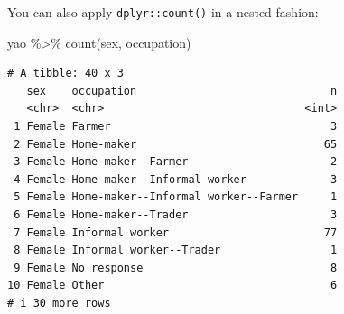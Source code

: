 \documentclass[
  letterpaper,
  DIV=11,
  numbers=noendperiod]{scrreprt}
\newenvironment{Shaded}{\begin{snugshade}}{\end{snugshade}}
\newcommand{\FunctionTok}[1]{\textcolor[rgb]{0.28,0.35,0.67}{#1}}
\newcommand{\NormalTok}[1]{\textcolor[rgb]{0.00,0.23,0.31}{#1}}
\newcommand{\SpecialCharTok}[1]{\textcolor[rgb]{0.37,0.37,0.37}{#1}}
\begin{document}
You can also apply \texttt{dplyr::count()} in a nested fashion:

\begin{Shaded}
\begin{Highlighting}[]
\NormalTok{yao }\SpecialCharTok{\%\textgreater{}\%}
  \FunctionTok{count}\NormalTok{(sex, occupation)}
\end{Highlighting}
\end{Shaded}

\begin{verbatim}
# A tibble: 40 x 3
   sex    occupation                              n
   <chr>  <chr>                               <int>
 1 Female Farmer                                  3
 2 Female Home-maker                             65
 3 Female Home-maker--Farmer                      2
 4 Female Home-maker--Informal worker             3
 5 Female Home-maker--Informal worker--Farmer     1
 6 Female Home-maker--Trader                      3
 7 Female Informal worker                        77
 8 Female Informal worker--Trader                 1
 9 Female No response                             8
10 Female Other                                   6
# i 30 more rows
\end{verbatim}
\end{document}
